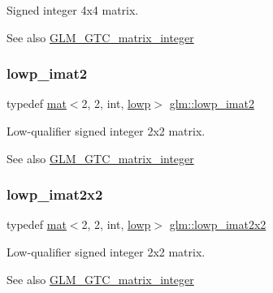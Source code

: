 Signed integer 4x4 matrix. \begin{DoxySeeAlso}{See also}
\hyperlink{group__gtc__matrix__integer}{G\+L\+M\+\_\+\+G\+T\+C\+\_\+matrix\+\_\+integer} 
\end{DoxySeeAlso}
\mbox{\label{group__gtc__matrix__integer_gae4e37c11bd4e1d22eaf128792a7a0030}} 
\subsubsection{\texorpdfstring{lowp\+\_\+imat2}{lowp\_imat2}}
{\footnotesize\ttfamily typedef \hyperlink{structglm_1_1mat}{mat}$<$2, 2, int, \hyperlink{namespaceglm_a36ed105b07c7746804d7fdc7cc90ff25ae161af3fc695e696ce3bf69f7332bc2d}{lowp}$>$ \hyperlink{group__gtc__matrix__integer_gae4e37c11bd4e1d22eaf128792a7a0030}{glm\+::lowp\+\_\+imat2}}

Low-\/qualifier signed integer 2x2 matrix. \begin{DoxySeeAlso}{See also}
\hyperlink{group__gtc__matrix__integer}{G\+L\+M\+\_\+\+G\+T\+C\+\_\+matrix\+\_\+integer} 
\end{DoxySeeAlso}
\mbox{\label{group__gtc__matrix__integer_gab3548c407d85abacc0ee73eeb91169a0}} 
\subsubsection{\texorpdfstring{lowp\+\_\+imat2x2}{lowp\_imat2x2}}
{\footnotesize\ttfamily typedef \hyperlink{structglm_1_1mat}{mat}$<$2, 2, int, \hyperlink{namespaceglm_a36ed105b07c7746804d7fdc7cc90ff25ae161af3fc695e696ce3bf69f7332bc2d}{lowp}$>$ \hyperlink{group__gtc__matrix__integer_gab3548c407d85abacc0ee73eeb91169a0}{glm\+::lowp\+\_\+imat2x2}}

Low-\/qualifier signed integer 2x2 matrix. \begin{DoxySeeAlso}{See also}
\hyperlink{group__gtc__matrix__integer}{G\+L\+M\+\_\+\+G\+T\+C\+\_\+matrix\+\_\+integer} 
\end{DoxySeeAlso}
\mbox{\label{group__gtc__matrix__integer_ga4b3b731b3f8ad88feee31e945c3618ca}} 
